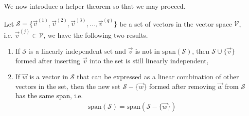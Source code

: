We now introduce a helper theorem so that we may proceed.
\begin{thm}
\label{thm:plusminus}
Let $\mathcal{S} = \{\vec{v}^{(1)}, \vec{v}^{(2)}, \vec{v}^{(3)}, \ldots, \vec{v}^{(q)}\}$ be a set of vectors in the vector space $\mathcal{V}$, i.e. $\vec{v}^{(j)} \in \mathcal{V}$, we have the following two results.
\begin{enumerate}[label=(\alph*)]
    \item If $\mathcal{S}$ is a linearly independent set and $\vec{v}$ is not in $\text{span}(\mathcal{S})$, then $\mathcal{S} \cup \{\vec{v}\}$ formed after inserting $\vec{v}$ into the set is still linearly independent,
    \item If $\vec{w}$ is a vector in $\mathcal{S}$ that can be expressed as a linear combination of other vectors in the set, then the new set $\mathcal{S} - \{\vec{w}\}$ formed after removing $\vec{w}$ from $\mathcal{S}$ has the same span, i.e.
    \begin{align*}
    \text{span}(\mathcal{S}) = \text{span}(\mathcal{S} - \{\vec{w}\})
    \end{align*}
\end{enumerate}
\end{thm}
